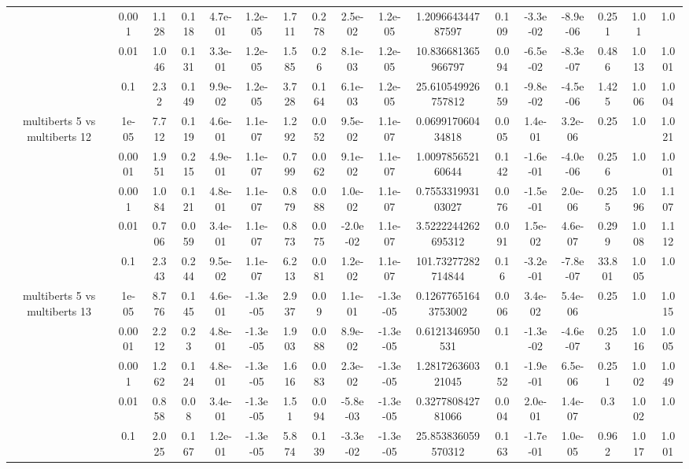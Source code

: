 \begin{tabular}{|c|c|c|c|c|c|c|c|c|c|c|c|c|c|c|c|c|}
 & 0.001 & 1.128 & 0.118 & 4.7e-01 & 1.2e-05 & 1.711 & 0.278 & 2.5e-02 & 1.2e-05 & 1.209664344787597 & 0.109 & -3.3e-02 & -8.9e-06 & 0.251 & 1.01 & 1.0 \\
 & 0.01 & 1.046 & 0.131 & 3.3e-01 & 1.2e-05 & 1.585 & 0.26 & 8.1e-03 & 1.2e-05 & 10.836681365966797 & 0.094 & -6.5e-02 & -8.3e-07 & 0.486 & 1.013 & 1.001 \\
 & 0.1 & 2.32 & 0.149 & 9.9e-02 & 1.2e-05 & 3.728 & 0.164 & 6.1e-03 & 1.2e-05 & 25.610549926757812 & 0.159 & -9.8e-02 & -4.5e-06 & 1.425 & 1.006 & 1.004 \\
\hline
\multirow{5}{*}{multiberts 5 vs multiberts 12} & 1e-05 & 7.712 & 0.119 & 4.6e-01 & 1.1e-07 & 1.292 & 0.052 & 9.5e-02 & 1.1e-07 & 0.069917060434818 & 0.005 & 1.4e-01 & 3.2e-06 & 0.25 & 1.0 & 1.021 \\
 & 0.0001 & 1.951 & 0.215 & 4.9e-01 & 1.1e-07 & 0.799 & 0.062 & 9.1e-02 & 1.1e-07 & 1.009785652160644 & 0.142 & -1.6e-01 & -4.0e-06 & 0.256 & 1.0 & 1.001 \\
 & 0.001 & 1.084 & 0.121 & 4.8e-01 & 1.1e-07 & 0.879 & 0.088 & 1.0e-02 & 1.1e-07 & 0.755331993103027 & 0.076 & -1.5e-01 & 2.0e-06 & 0.255 & 1.096 & 1.107 \\
 & 0.01 & 0.706 & 0.059 & 3.4e-01 & 1.1e-07 & 0.873 & 0.075 & -2.0e-02 & 1.1e-07 & 3.5222244262695312 & 0.091 & 1.5e-02 & 4.6e-07 & 0.299 & 1.008 & 1.112 \\
 & 0.1 & 2.343 & 0.244 & 9.5e-02 & 1.1e-07 & 6.213 & 0.081 & 1.2e-02 & 1.1e-07 & 101.73277282714844 & 0.16 & -3.2e-01 & -7.8e-07 & 33.801 & 1.005 & 1.0 \\
\hline
\multirow{5}{*}{multiberts 5 vs multiberts 13} & 1e-05 & 8.776 & 0.145 & 4.6e-01 & -1.3e-05 & 2.937 & 0.09 & 1.1e-01 & -1.3e-05 & 0.12677651643753002 & 0.006 & 3.4e-02 & 5.4e-06 & 0.25 & 1.0 & 1.015 \\
 & 0.0001 & 2.212 & 0.23 & 4.8e-01 & -1.3e-05 & 1.903 & 0.088 & 8.9e-02 & -1.3e-05 & 0.6121346950531 & 0.1 & -1.3e-02 & -4.6e-07 & 0.253 & 1.016 & 1.005 \\
 & 0.001 & 1.262 & 0.124 & 4.8e-01 & -1.3e-05 & 1.616 & 0.083 & 2.3e-02 & -1.3e-05 & 1.281726360321045 & 0.152 & -1.9e-01 & 6.5e-06 & 0.251 & 1.002 & 1.049 \\
 & 0.01 & 0.858 & 0.08 & 3.4e-01 & -1.3e-05 & 1.51 & 0.094 & -5.8e-03 & -1.3e-05 & 0.327780842781066 & 0.004 & 2.0e-01 & 1.4e-07 & 0.3 & 1.002 & 1.0 \\
 & 0.1 & 2.025 & 0.167 & 1.2e-01 & -1.3e-05 & 5.874 & 0.139 & -3.3e-02 & -1.3e-05 & 25.853836059570312 & 0.163 & -1.7e-01 & 1.0e-05 & 0.962 & 1.017 & 1.001 \\

\end{tabular}
